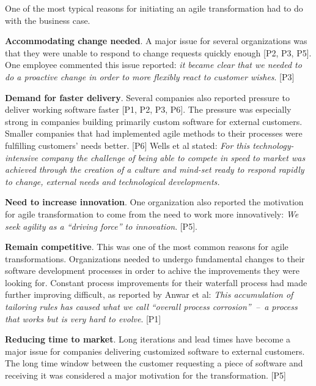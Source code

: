 One of the most typical reasons for initiating an agile transformation
had to do with the business case.

{\bfseries Accommodating change needed}. A major issue for several
organizations was that they were unable to respond to change requests
quickly enough [P2, P3, P5]. One employee commented this issue reported:
\textit{it became clear that we needed to do a proactive change in order
to more flexibly react to customer wishes}. [P3]

{\bfseries Demand for faster delivery}. Several companies also reported
pressure to deliver working software faster [P1, P2, P3, P6]. The
pressure was especially strong in companies building primarily custom
software for external customers. Smaller companies that had implemented
agile methods to their processes were fulfilling customers' needs
better. [P6] Wells et al stated: \textit{For this technology{-}intensive
company the challenge of being able to compete in speed to market was
achieved through the creation of a culture and mind-set ready to respond
rapidly to change, external needs and technological developments.}

{\bfseries Need to increase innovation}. One organization also reported
the motivation for agile transformation to come from the need to work
more innovatively: \textit{We seek agility as a ``driving force'' to
innovation}. [P5].

{\bfseries Remain competitive}. This was one of the most common reasons for
agile transformations. Organizations needed to undergo fundamental changes to
their software development processes in order to achive the improvements they
were looking for. Constant process improvements for their waterfall process had
made further improving difficult, as reported by Anwar et al: \textit{This
accumulation of tailoring rules has caused what we call ``overall process
corrosion'' – a process that works but is very hard to evolve}. [P1]

{\bfseries Reducing time to market}. Long iterations and lead times have become
a major issue for companies delivering customized software to external
customers. The long time window between the customer requesting a piece of
software and receiving it was considered a major motivation for the
transformation. [P5]

